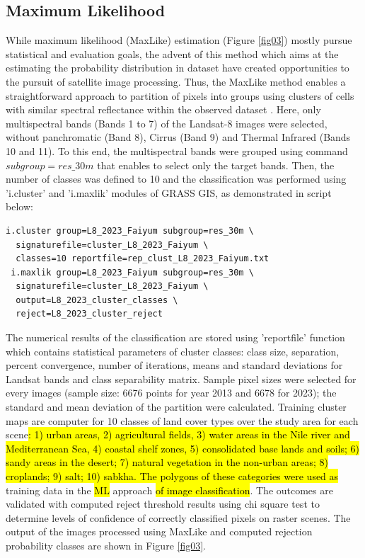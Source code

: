 \documentclass[final,5p,times,twocolumn]{elsarticle}
\numberwithin{table}{section}
\begin{document}
\subsection{Maximum Likelihood}
While maximum likelihood (MaxLike) estimation (Figure \ref{fig03}) mostly pursue statistical and evaluation goals, the advent of this method which aims at the estimating the probability distribution in dataset have created opportunities to the pursuit of satellite image processing. Thus, the MaxLike method enables a straightforward approach to partition of pixels into groups using clusters of cells with similar spectral reflectance within the observed dataset \cite{6079300}. Here, only multispectral bands (Bands 1 to 7) of the Landsat-8 images were selected, without panchromatic (Band 8), Cirrus (Band 9) and Thermal Infrared  (Bands 10 and 11). To this end, the multispectral bands were grouped using command $subgroup=res\_30m$ that enables to select only the target bands. Then, the number of classes was defined to 10 and the classification was performed using 'i.cluster' and 'i.maxlik' modules of GRASS GIS, as demonstrated in script below: 

\begin{footnotesize}
\begin{verbatim}
i.cluster group=L8_2023_Faiyum subgroup=res_30m \
  signaturefile=cluster_L8_2023_Faiyum \
  classes=10 reportfile=rep_clust_L8_2023_Faiyum.txt
 i.maxlik group=L8_2023_Faiyum subgroup=res_30m \
  signaturefile=cluster_L8_2023_Faiyum \
  output=L8_2023_cluster_classes \
  reject=L8_2023_cluster_reject
\end{verbatim}
\end{footnotesize}

The numerical results of the classification are stored using 'reportfile' function which contains statistical parameters of cluster classes: class size, separation, percent convergence, number of iterations, means and standard deviations for Landsat bands and class separability matrix. Sample pixel sizes were selected for every images (sample size: 6676 points for year 2013 and 6678 for 2023); the standard and mean deviation of the partition were calculated. Training cluster maps are computer for 10 classes of land cover types over the study area for each scene\hl{: 1) urban areas, 2) agricultural fields, 3) water areas in the Nile river and Mediterranean Sea, 4) coastal shelf zones, 5) consolidated base lands and soils; 6) sandy areas in the desert; 7) natural vegetation in the non-urban areas; 8) croplands; 9) salt; 10) sabkha. The polygons of these categories were used as} training data in the \hl{ML} approach \hl{of image classification}. The outcomes are validated with computed reject threshold results using chi square test to determine levels of confidence of correctly classified pixels on raster scenes. The output of the images processed using MaxLike and computed rejection probability classes are shown in Figure \ref{fig03}.
\end{document}
